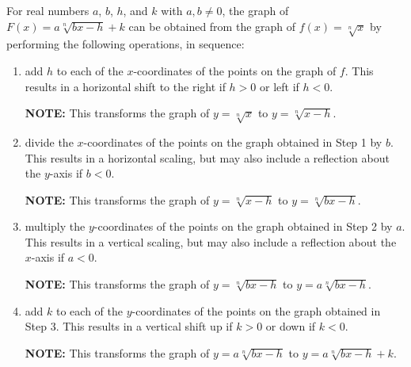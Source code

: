\documentclass{ximera}
\begin{document}
\colorbox{ResultColor}{\bbm

\begin{thm} \label{linearrootgraphs}  For real numbers $a$, $b$, $h$, and $k$ with $a, b \neq 0$, the graph of $F(x) = a\sqrt[n]{bx-h} +k$  can be obtained from the graph of $f(x) = \sqrt[n]{x}$ by performing the following operations, in sequence:


\begin{enumerate}

\item  add $h$ to each of the $x$-coordinates of the points on the graph of $f$.  This results in a horizontal shift to the right if $h > 0$ or left if $h < 0$.

\textbf{NOTE:}  This transforms the graph of $y = \sqrt[n]{x}$ to $y = \sqrt[n]{x-h}$.

\item  divide the $x$-coordinates of the points on the graph obtained in Step 1 by $b$.  This results in a horizontal scaling, but may also include a reflection about the $y$-axis if $b < 0$.

\textbf{NOTE:}  This transforms the graph of $y = \sqrt[n]{x-h}$ to $y = \sqrt[n]{bx-h}$.

\item  multiply the $y$-coordinates of the points on the graph obtained in Step 2 by $a$.   This results in a vertical scaling, but may also include a reflection about the $x$-axis if $a < 0$.

\textbf{NOTE:}  This transforms the graph of $y = \sqrt[n]{bx-h}$ to $y = a\sqrt[n]{bx-h}$.

\item  add $k$ to each of the $y$-coordinates of the points on the graph obtained in Step 3.  This results in a vertical shift up if $k > 0$ or down if $k< 0$.

\textbf{NOTE:}  This transforms the graph of $y = a\sqrt[n]{bx-h}$ to $y = a\sqrt[n]{bx-h} + k$.

\end{enumerate}


\end{thm}

\ebm}
\end{document}

